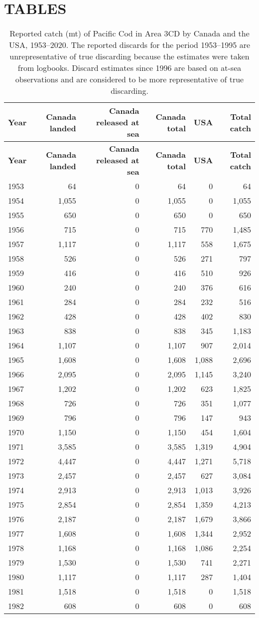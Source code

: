 \documentclass[11pt]{book}
\begin{document}
\hypertarget{sec:tables}{%
\section{TABLES}\label{sec:tables}}
\begin{longtable}[]{@{}lrrrrr@{}}
\caption{\label{tab:tab-catch-3cd}Reported catch (mt) of Pacific Cod in Area 3CD by Canada and the USA, 1953--2020. The reported discards for the period 1953--1995 are unrepresentative of true discarding because the estimates were taken from logbooks. Discard estimates since 1996 are based on at-sea observations and are considered to be more representative of true discarding.}\tabularnewline
\toprule
\textbf{Year} & \textbf{Canada landed} & \textbf{Canada released at sea} & \textbf{Canada total} & \textbf{USA} & \textbf{Total catch}\tabularnewline
\midrule
\endfirsthead
\toprule
\textbf{Year} & \textbf{Canada landed} & \textbf{Canada released at sea} & \textbf{Canada total} & \textbf{USA} & \textbf{Total catch}\tabularnewline
\midrule
\endhead
1953 & 64 & 0 & 64 & 0 & 64\tabularnewline
1954 & 1,055 & 0 & 1,055 & 0 & 1,055\tabularnewline
1955 & 650 & 0 & 650 & 0 & 650\tabularnewline
1956 & 715 & 0 & 715 & 770 & 1,485\tabularnewline
1957 & 1,117 & 0 & 1,117 & 558 & 1,675\tabularnewline
1958 & 526 & 0 & 526 & 271 & 797\tabularnewline
1959 & 416 & 0 & 416 & 510 & 926\tabularnewline
1960 & 240 & 0 & 240 & 376 & 616\tabularnewline
1961 & 284 & 0 & 284 & 232 & 516\tabularnewline
1962 & 428 & 0 & 428 & 402 & 830\tabularnewline
1963 & 838 & 0 & 838 & 345 & 1,183\tabularnewline
1964 & 1,107 & 0 & 1,107 & 907 & 2,014\tabularnewline
1965 & 1,608 & 0 & 1,608 & 1,088 & 2,696\tabularnewline
1966 & 2,095 & 0 & 2,095 & 1,145 & 3,240\tabularnewline
1967 & 1,202 & 0 & 1,202 & 623 & 1,825\tabularnewline
1968 & 726 & 0 & 726 & 351 & 1,077\tabularnewline
1969 & 796 & 0 & 796 & 147 & 943\tabularnewline
1970 & 1,150 & 0 & 1,150 & 454 & 1,604\tabularnewline
1971 & 3,585 & 0 & 3,585 & 1,319 & 4,904\tabularnewline
1972 & 4,447 & 0 & 4,447 & 1,271 & 5,718\tabularnewline
1973 & 2,457 & 0 & 2,457 & 627 & 3,084\tabularnewline
1974 & 2,913 & 0 & 2,913 & 1,013 & 3,926\tabularnewline
1975 & 2,854 & 0 & 2,854 & 1,359 & 4,213\tabularnewline
1976 & 2,187 & 0 & 2,187 & 1,679 & 3,866\tabularnewline
1977 & 1,608 & 0 & 1,608 & 1,344 & 2,952\tabularnewline
1978 & 1,168 & 0 & 1,168 & 1,086 & 2,254\tabularnewline
1979 & 1,530 & 0 & 1,530 & 741 & 2,271\tabularnewline
1980 & 1,117 & 0 & 1,117 & 287 & 1,404\tabularnewline
1981 & 1,518 & 0 & 1,518 & 0 & 1,518\tabularnewline
1982 & 608 & 0 & 608 & 0 & 608\tabularnewline

\end{longtable}
\end{document}

